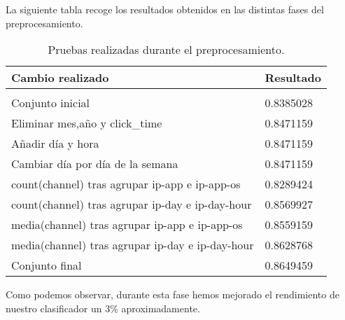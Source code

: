 \medskip
La siguiente tabla recoge los resultados obtenidos en las distintas fases del preprocesamiento.
\begin{table}[H]
	\centering
	
	\begin{tabular}{ll}
		\textbf{Cambio realizado}& \textbf{Resultado} \\
		\hline
		\\
		Conjunto inicial& 0.8385028     \\
		Eliminar mes,año y click\_time& 0.8471159  \\
		Añadir día y hora&  0.8471159 \\
		Cambiar día por día de la semana & 0.8471159\\
		count(channel) tras agrupar ip-app e ip-app-os & 0.8289424 \\
		count(channel) tras agrupar ip-day e ip-day-hour & 0.8569927 \\
		media(channel) tras agrupar ip-app e ip-app-os & 0.8559159 \\
		media(channel) tras agrupar ip-day e ip-day-hour & 0.8628768 \\
		Conjunto final & 0.8649459
	\end{tabular}
\caption{Pruebas realizadas durante el preprocesamiento.}
\end{table}

Como podemos observar, durante esta fase hemos mejorado el rendimiento de nuestro clasificador un 3\% aproximadamente.